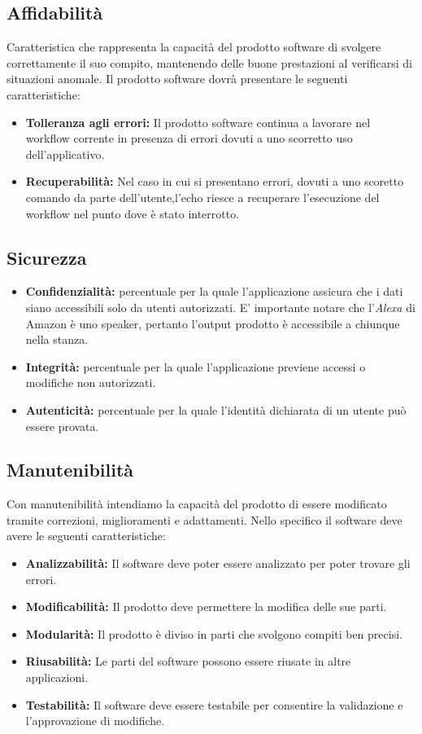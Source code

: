 \subsection{Affidabilità}
Caratteristica che rappresenta la capacità del prodotto software di svolgere correttamente il suo compito, mantenendo delle buone prestazioni al verificarsi di situazioni anomale. 
Il prodotto software dovrà presentare le seguenti caratteristiche:
\begin{itemize}
	\item \textbf{Tolleranza agli errori:} Il prodotto software continua a lavorare nel workflow corrente in presenza di errori dovuti a uno scorretto uso dell'applicativo.
	\item \textbf{Recuperabilità:} Nel caso in cui si presentano errori, dovuti a uno scoretto comando da parte dell'utente,l'echo riesce a recuperare l'esecuzione  del workflow nel punto dove è stato interrotto.
\end{itemize}
\subsection{Sicurezza}
\begin{itemize}
	\item \textbf{Confidenzialità:} percentuale per la quale l'applicazione assicura che i dati siano accessibili solo da utenti autorizzati. E' importante notare che l'\textit{Alexa} di Amazon è uno speaker, pertanto l'output prodotto è accessibile a chiunque nella stanza.
	\item \textbf{Integrità:} percentuale per la quale l'applicazione previene accessi o modifiche non autorizzati.
	\item \textbf{Autenticità:} percentuale per la quale l'identità dichiarata di un utente può essere provata.
\end{itemize}
\subsection{Manutenibilità}
Con manutenibilità intendiamo la capacità del prodotto di essere modificato tramite correzioni, miglioramenti e adattamenti.
Nello specifico il software deve avere le seguenti caratteristiche:
\begin{itemize}
	\item \textbf{Analizzabilità:} Il software deve poter essere analizzato per poter trovare gli errori.
	\item \textbf{Modificabilità:} Il prodotto deve permettere la modifica delle sue parti.
	\item \textbf{Modularità:} Il prodotto è diviso in parti che svolgono compiti ben precisi.
	\item \textbf{Riusabilità:} Le parti del software possono essere riusate in altre applicazioni.
	\item \textbf{Testabilità:} Il software deve essere testabile per consentire la validazione e l'approvazione di modifiche.
\end{itemize}	
	